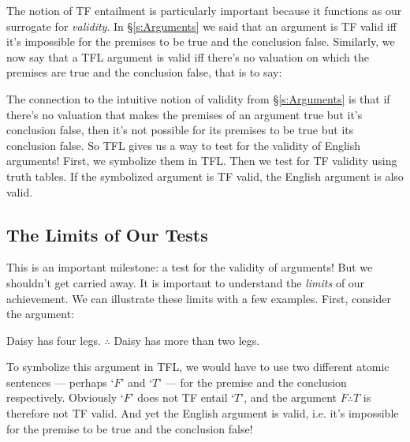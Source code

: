 The notion of TF entailment is particularly important because it functions as our surrogate for \emph{validity}.  In \S\ref{s:Arguments} we said that an argument is TF valid iff it's impossible for the premises to be true and the conclusion false.  Similarly, we now say that a TFL argument is valid iff there's no valuation on which the premises are true and the conclusion false, that is to say:


The connection to the intuitive notion of validity from \S\ref{s:Arguments} is that if there's no valuation that makes the premises of an argument true but it's conclusion false, then it's not possible for its premises to be true but its conclusion false.  So TFL gives us a way to test for the validity of English arguments! First, we symbolize them in TFL.  Then we test for TF validity using truth tables.   If the symbolized argument is TF valid, the English argument is also valid.


\subsection{The Limits of Our Tests}\label{s:TFTestLimits}

This is an important milestone: a test for the validity of arguments! But we shouldn't get carried away.  It is important to understand the \emph{limits} of our achievement. We can illustrate these limits with a few examples.  First, consider the argument:
	\begin{earg}
	\setcounter{eargnum}{0}
		\item Daisy has four legs. $\therefore$ Daisy has more than two legs.
	\end{earg}
To symbolize this argument in TFL, we would have to use two different atomic sentences --- perhaps `$F$'  and `$T$' --- for the premise and the conclusion respectively. Obviously `$F$' does not TF entail `$T$', and the argument $F \therefore T$ is therefore not TF valid.  And yet the English argument is valid, i.e. it's impossible for the premise to be true and the conclusion false!

